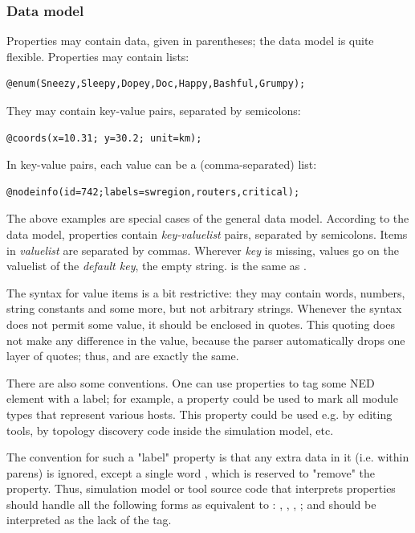 \subsubsection{Data model}

Properties may contain data, given in parentheses; the data model is quite
flexible. Properties may contain lists:

\begin{Verbatim}
@enum(Sneezy,Sleepy,Dopey,Doc,Happy,Bashful,Grumpy);
\end{Verbatim}

They may contain key-value pairs, separated by semicolons:

\begin{Verbatim}
@coords(x=10.31; y=30.2; unit=km);
\end{Verbatim}

In key-value pairs, each value can be a (comma-separated) list:

\begin{Verbatim}
@nodeinfo(id=742;labels=swregion,routers,critical);
\end{Verbatim}

The above examples are special cases of the general data model. According
to the data model, properties contain \textit{key-valuelist} pairs,
separated by semicolons. Items in \textit{valuelist} are separated by
commas. Wherever \textit{key} is missing, values go on the valuelist of the
\textit{default key}, the empty string.  is the same
as .

The syntax for value items is a bit restrictive: they may contain words,
numbers, string constants and some more, but not arbitrary strings.
Whenever the syntax does not permit some value, it should be enclosed in
quotes. This quoting does not make any difference in the value, because
the parser automatically drops one layer of quotes; thus, 
and  are exactly the same.

There are also some conventions. One can use properties to tag some NED element
with a label; for example, a  property could be used to mark
all module types that represent various hosts. This property could be used
e.g. by editing tools, by topology discovery code inside the simulation model, etc.

The convention for such a "label" property is that any extra data in it
(i.e. within parens) is ignored, except a single word , which is
reserved to "remove" the property. Thus, simulation model or tool source
code that interprets properties should handle all the following forms as
equivalent to : , ,
, ; and
 should be interpreted as the lack of the 
tag.


